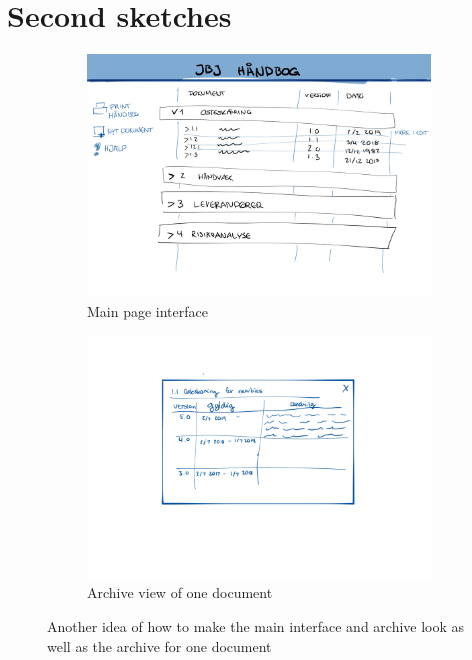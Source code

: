 \section{Second sketches}\label{sec:Second-sketches}
\begin{figure}[H]
	\centering
	\begin{subfigure}[b]{0.48\textwidth}
		\includegraphics[width=\textwidth]{billeder/Main-view2.jpg}
		\caption{Main page interface}
		\label{fig:2-Main}
	\end{subfigure}
	\quad
	\begin{subfigure}[b]{0.48\textwidth}
		\includegraphics[width=\textwidth]{billeder/Archive-view2.jpg}
		\caption{Archive view of one document}
		\label{fig:2-Archive}
	\end{subfigure}
	\caption{Another idea of how to make the main interface and archive look as well as the archive for one document}
\end{figure}



